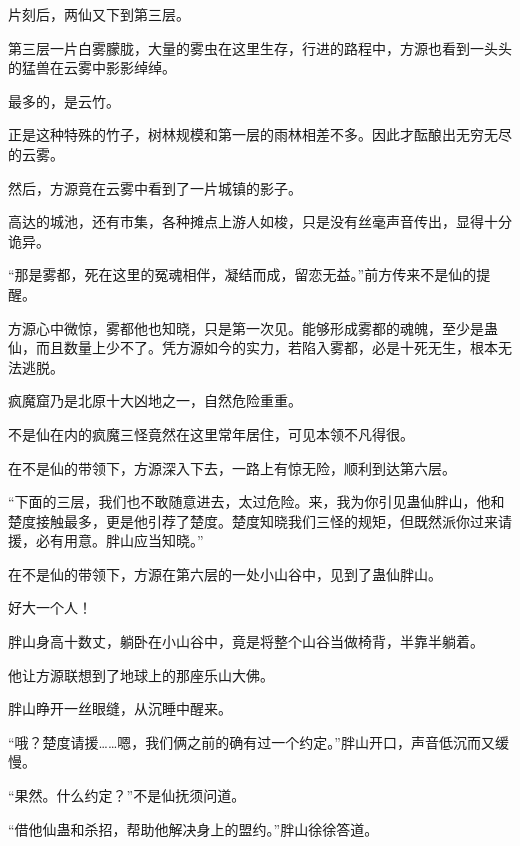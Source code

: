 \begin{this_body}
片刻后，两仙又下到第三层。

第三层一片白雾朦胧，大量的雾虫在这里生存，行进的路程中，方源也看到一头头的猛兽在云雾中影影绰绰。

最多的，是云竹。

正是这种特殊的竹子，树林规模和第一层的雨林相差不多。因此才酝酿出无穷无尽的云雾。

然后，方源竟在云雾中看到了一片城镇的影子。

高达的城池，还有市集，各种摊点上游人如梭，只是没有丝毫声音传出，显得十分诡异。

“那是雾都，死在这里的冤魂相伴，凝结而成，留恋无益。”前方传来不是仙的提醒。

方源心中微惊，雾都他也知晓，只是第一次见。能够形成雾都的魂魄，至少是蛊仙，而且数量上少不了。凭方源如今的实力，若陷入雾都，必是十死无生，根本无法逃脱。

疯魔窟乃是北原十大凶地之一，自然危险重重。

不是仙在内的疯魔三怪竟然在这里常年居住，可见本领不凡得很。

在不是仙的带领下，方源深入下去，一路上有惊无险，顺利到达第六层。

“下面的三层，我们也不敢随意进去，太过危险。来，我为你引见蛊仙胖山，他和楚度接触最多，更是他引荐了楚度。楚度知晓我们三怪的规矩，但既然派你过来请援，必有用意。胖山应当知晓。”

在不是仙的带领下，方源在第六层的一处小山谷中，见到了蛊仙胖山。

好大一个人！

胖山身高十数丈，躺卧在小山谷中，竟是将整个山谷当做椅背，半靠半躺着。

他让方源联想到了地球上的那座乐山大佛。

胖山睁开一丝眼缝，从沉睡中醒来。

“哦？楚度请援……嗯，我们俩之前的确有过一个约定。”胖山开口，声音低沉而又缓慢。

“果然。什么约定？”不是仙抚须问道。

“借他仙蛊和杀招，帮助他解决身上的盟约。”胖山徐徐答道。

\end{this_body}

